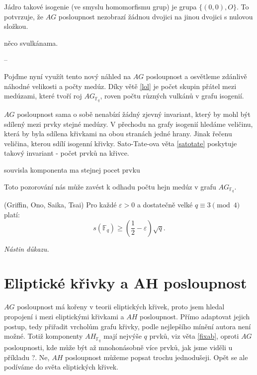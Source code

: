 \documentclass[12pt]{report}
\begin{document}
Jádro takové isogenie (ve smyslu homomorfismu grup) je grupa $\lbrace (0,0), O \rbrace $. To potvrzuje, že $AG$ posloupnost nezobrazí žádnou dvojici na jinou dvojici s nulovou složkou.


něco svulkánama. 

--

Pojďme nyní využít tento nový náhled na $AG$ posloupnost a osvětleme zdánlivě náhodné velikosti a počty medúz. Díky větě \ref{lol} je počet skupin přátel mezi medúzami, které tvoří roj $AG_{\mathbb{F}_q}$, roven počtu různých vulkánů v grafu isogenií. 

$AG$ posloupnost sama o sobě nenabízí žádný zjevný invariant, který by mohl být sdílený mezi prvky stejné medúzy. V přechodu na grafy isogenií hledáme veličinu, která by byla sdílena křivkami na obou stranách jedné hrany. Jinak řečenu veličina, kterou sdílí isogenní křivky. Sato-Tate-ova věta \ref{satotate} poskytuje takový invariant - počet prvků na křivce. 

\begin{veta}
souvisla komponenta ma stejnej pocet prvku
\end{veta}


Toto pozorování nás může zavést k odhadu počtu hejn medúz v grafu $AG_{\mathbb{F}_q}$.


\begin{veta}(Griffin, Ono, Saika, Tsai)
Pro každé $\varepsilon>0$ a dostatečně velké $q \equiv 3 \pmod{4}$ platí:
$$s(\mathbb{F}_q) \geqslant \left(\frac{1}{2} - \varepsilon \right) \sqrt{q}.$$
\end{veta}
\noindent \textit{Nástin důkazu.}



\chapter{Eliptické křivky a AH posloupnost}

$AG$ posloupnost má kořeny v teorii eliptických křivek, proto jsem hledal propojení i mezi eliptickými křivkami a $AH$ posloupnost.
Přímo adaptovat jejich postup, tedy přiřadit vrcholům grafu křivky, podle nejlepšího mínění autora není možné. Totiž komponenty $AH_{\mathbb{F}_q}$ mají nejvýše $q$ prvků, viz věta \ref{fixab}, oproti $AG$ posloupnosti, kde může být až mnohonásobně více prvků, jak jsme viděli u příkladu ?.  Ne, $AH$ posloupnost můžeme popsat trochu jednodušeji. Opět se ale podíváme do světa eliptických křivek. 
\end{document}
